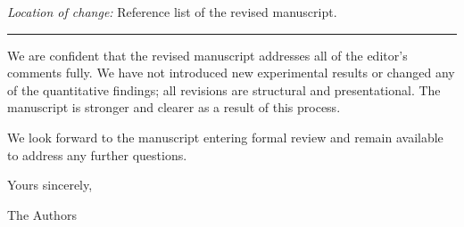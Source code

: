 \documentclass[12pt,a4paper]{article}
\begin{document}
\textit{Location of change:} Reference list of the revised manuscript.

\vspace{0.5cm}


\hrule
\vspace{0.5cm}

We are confident that the revised manuscript addresses all of the editor's comments fully. We have not introduced new experimental results or changed any of the quantitative findings; all revisions are structural and presentational. The manuscript is stronger and clearer as a result of this process.

We look forward to the manuscript entering formal review and remain available to address any further questions.

\vspace{1cm}

\noindent Yours sincerely,

\vspace{1.5cm}

\noindent The Authors
\end{document}
